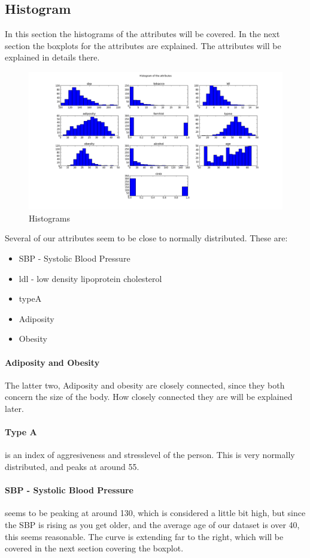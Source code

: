 \subsection{Histogram}
In this section the histograms of the attributes will be covered. In the next section the boxplots for the attributes are explained. The attributes will be explained in details there.
\begin{figure}[H]
\centering
\includegraphics[width=12cm, keepaspectratio=true]{pictures/histogram.png}
\caption{\footnotesize Histograms}
\label{histogram}
\end{figure}
Several of our attributes seem to be close to normally distributed. These are:
\begin{itemize}
\item SBP - Systolic Blood Pressure
\item ldl - low density lipoprotein cholesterol
\item typeA
\item Adiposity
\item Obesity
\end{itemize}
\paragraph{Adiposity and Obesity}
The latter two, Adiposity and obesity are closely connected, since they both concern the size of the body. How closely connected they are will be explained later.

\paragraph{Type A} is an index of aggresiveness and stresslevel of the person. This is very normally distributed, and peaks at around 55.

\paragraph{SBP - Systolic Blood Pressure} 	seems to be peaking at around 130, which is considered a little bit high, but since the SBP is rising as you get older, and the average age of our dataset is over 40, this seems reasonable. The curve is extending far to the right, which will be covered in the next section covering the boxplot.


